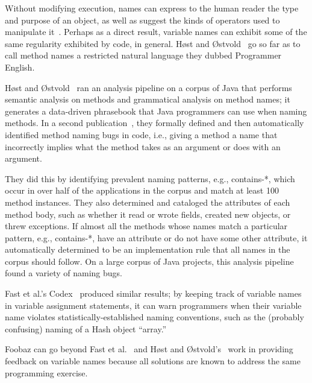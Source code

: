 Without modifying execution, names can express to the human reader the type and purpose of an object, as well as suggest the kinds of operators used to manipulate it~\cite{jones2008operand}. Perhaps as a direct result, variable names can exhibit some of the same regularity exhibited by code, in general. H{{\o{}}}st and {{\O{}}}stvold~\cite{host2008java} go so far as to call method names a restricted natural language they dubbed Programmer English.

H{{\o{}}}st and {{\O{}}}stvold~\cite{host2008java} ran an analysis pipeline on a corpus of Java that performs semantic analysis on methods and grammatical analysis on method names; it generates a data-driven phrasebook that Java programmers can use when naming methods. In a second publication~\cite{host2009debugging}, they formally defined and then automatically identified method naming bugs in code, i.e., giving a method a name that incorrectly implies what the method takes as an argument or does with an argument.

They did this by identifying prevalent naming patterns, e.g., contains-*, which occur in over half of the applications in the corpus and match at least 100 method instances. They also determined and cataloged the attributes of each method body, such as whether it read or wrote fields, created new objects, or threw exceptions. If almost all the methods whose names match a particular pattern, e.g., contains-*, have an attribute or do not have some other attribute, it automatically determined to be an implementation rule that all names in the corpus should follow. On a large corpus of Java projects, this analysis pipeline found a variety of naming bugs.

Fast et al.'s Codex~\cite{codex} produced similar results; by keeping track of variable names in variable assignment statements, it can warn programmers when their variable name violates statistically-established naming conventions, such as the (probably confusing) naming of a Hash object ``array.'' 

Foobaz can go beyond Fast et al.~\cite{codex} and H{{\o{}}}st and {{\O{}}}stvold's~\cite{host2008java,host2009debugging} work in providing feedback on variable names because all solutions are known to address the same programming exercise.

